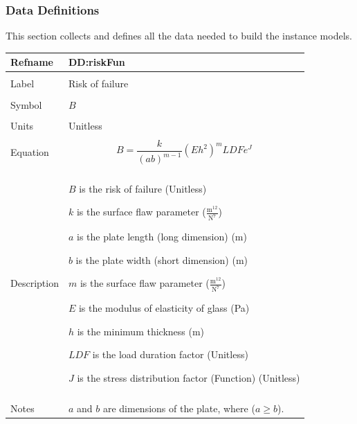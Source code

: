 \documentclass[12pt]{article}
\begin{document}
\subsubsection{Data Definitions}
\label{Sec:DDs}
This section collects and defines all the data needed to build the instance models.


\noindent \begin{minipage}{\textwidth}
\begin{tabular}{>{\raggedright}p{}>{\raggedright\arraybackslash}p{}}
\toprule \textbf{Refname} & \textbf{DD:riskFun}
\label{DD:riskFun}
\\ \midrule \\
Label & Risk of failure
        
\\ \midrule \\
Symbol & $B$
         
\\ \midrule \\
Units & Unitless
        
\\ \midrule \\
Equation & \begin{displaymath}
           B=\frac{k}{\left(a b\right)^{m-1}} \left(E h^{2}\right)^{m} LDF e^{J}
           \end{displaymath}
\\ \midrule \\
Description & \begin{symbDescription}
              \item{$B$ is the risk of failure (Unitless)}
              \item{$k$ is the surface flaw parameter ($\frac{\text{m}^{12}}{\text{N}^{7}}$)}
              \item{$a$ is the plate length (long dimension) (m)}
              \item{$b$ is the plate width (short dimension) (m)}
              \item{$m$ is the surface flaw parameter ($\frac{\text{m}^{12}}{\text{N}^{7}}$)}
              \item{$E$ is the modulus of elasticity of glass (Pa)}
              \item{$h$ is the minimum thickness (m)}
              \item{$LDF$ is the load duration factor (Unitless)}
              \item{$J$ is the stress distribution factor (Function) (Unitless)}
              \end{symbDescription}
\\ \midrule \\
Notes & $a$ and $b$ are dimensions of the plate, where ($a\geq{}b$).
        

\end{tabular}
\end{minipage}
\end{document}
